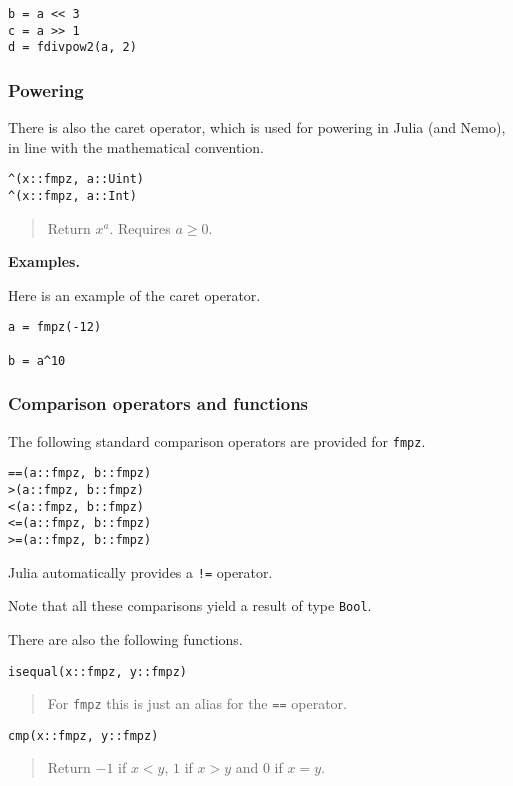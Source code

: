 \documentclass[a4paper,10pt]{article}
\newcommand{\code}{\lstinline}
\newcommand{\desc}[1]{\vspace{-3mm}\begin{quote}#1\end{quote}}
\begin{document}
{{\begin{lstlisting}
b = a << 3
c = a >> 1
d = fdivpow2(a, 2)
\end{lstlisting}

\subsubsection{Powering}

There is also the caret operator, which is used for powering in Julia (and Nemo), in
line with the mathematical convention.

\begin{lstlisting}
^(x::fmpz, a::Uint)
^(x::fmpz, a::Int)
\end{lstlisting}

\desc{Return $x^a$. Requires $a \geq 0$.}

\textbf{Examples.}

Here is an example of the caret operator.

\begin{lstlisting}
a = fmpz(-12)

b = a^10
\end{lstlisting}

\subsubsection{Comparison operators and functions}

The following standard comparison operators are provided for \code{fmpz}.

\begin{lstlisting}
==(a::fmpz, b::fmpz)
>(a::fmpz, b::fmpz)
<(a::fmpz, b::fmpz)
<=(a::fmpz, b::fmpz)
>=(a::fmpz, b::fmpz)
\end{lstlisting}

Julia automatically provides a \code{!=} operator.

Note that all these comparisons yield a result of type \code{Bool}.

There are also the following functions.

\begin{lstlisting}
isequal(x::fmpz, y::fmpz)
\end{lstlisting}

\desc{For \code{fmpz} this is just an alias for the \code{==} operator.}

\begin{lstlisting}
cmp(x::fmpz, y::fmpz)
\end{lstlisting}

\desc{Return $-1$ if $x < y$, $1$ if $x > y$ and $0$ if $x = y$.}

}}
\end{document}

